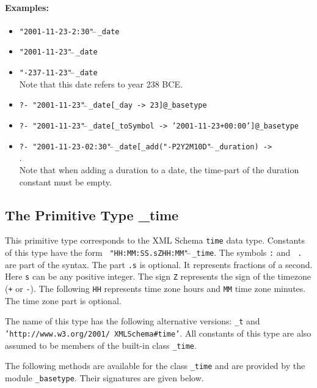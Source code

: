 \documentclass[11pt]{article}
\begin{document}
\paragraph{Examples:}
\begin{itemize}
  \item {\tt "2001-11-23-2:30"$\hat{~}\hat{~}$\_date} 
  \item {\tt "2001-11-23"$\hat{~}\hat{~}$\_date}  
  \item {\tt "-237-11-23"$\hat{~}\hat{~}$\_date}\\
    Note that this date refers to year 238 BCE.
  \item {\tt ?- "2001-11-23"$\hat{~}\hat{~}$\_date[\_day -> 23]@\_basetype}  
  \item {\tt ?- "2001-11-23"$\hat{~}\hat{~}$\_date[\_toSymbol ->
      '2001-11-23+00:00']@\_basetype}  
  \item {\tt ?- "2001-11-23-02:30"$\hat{~}\hat{~}$\_date[\_add("-P2Y2M10D"$\hat{~}\hat{~}$\_duration) ->}\\
  \hspace*{7cm}{\tt
    "1979-09-13-02:30"$\hat{~}\hat{~}$\_dt]@\_basetype}.\\
  Note that when adding a duration to a date, the time-part of the duration
  constant must be empty.
\end{itemize}

\subsection{ The Primitive Type \_time}

This primitive type corresponds to the XML Schema {\tt time} data type.
Constants of this type have the form {\tt
  "HH:MM:SS.sZHH:MM"$\hat{~}\hat{~}$\_time}.  The symbols {\tt :} and {\tt
  .}  are part of the syntax. The part {\tt .s} is optional. It represents
fractions of a second. Here {\tt s} can be any positive integer. The sign
{\tt Z} represents the sign of the timezone ({\tt +} or {\tt -}). The
following {\tt HH} represents time zone hours and {\tt MM} time zone
minutes. The time zone part is optional.


The name of this type has the following alternative versions:
{\tt \_t} and  {\tt 'http://www.w3.org/2001/ XMLSchema\#time'}. 
All constants of this type are also assumed to be members of the built-in
class {\tt \_time}. 

The following methods are available for the class {\tt \_time} and are
provided by the module {\tt \_basetype}.  Their signatures are given below.
\end{document}
